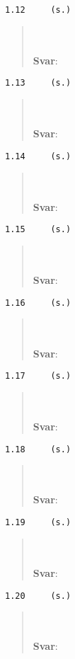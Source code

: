 \documentclass[a4paper]{article}
\newcommand{\tskcol}[1]{\textcolor{tskcol}{#1}}
\begin{document}
\texttt{\tskcol{1.12~~~~ (s.)}}
\begin{quotation}
	\noindent
	\\ \\
	\textbf{Svar}:
\end{quotation}

\texttt{\tskcol{1.13~~~~ (s.)}}
\begin{quotation}
	\noindent
	\\ \\
	\textbf{Svar}:
\end{quotation}

\texttt{\tskcol{1.14~~~~ (s.)}}
\begin{quotation}
	\noindent
	\\ \\
	\textbf{Svar}:
\end{quotation}

\texttt{\tskcol{1.15~~~~ (s.)}}
\begin{quotation}
	\noindent
	\\ \\
	\textbf{Svar}:
\end{quotation}

\texttt{\tskcol{1.16~~~~ (s.)}}
\begin{quotation}
	\noindent
	\\ \\
	\textbf{Svar}:
\end{quotation}

\texttt{\tskcol{1.17~~~~ (s.)}}
\begin{quotation}
	\noindent
	\\ \\
	\textbf{Svar}:
\end{quotation}

\texttt{\tskcol{1.18~~~~ (s.)}}
\begin{quotation}
	\noindent
	\\ \\
	\textbf{Svar}:
\end{quotation}

\texttt{\tskcol{1.19~~~~ (s.)}}
\begin{quotation}
	\noindent
	\\ \\
	\textbf{Svar}:
\end{quotation}

\texttt{\tskcol{1.20~~~~ (s.)}}
\begin{quotation}
	\noindent
	\\ \\
	\textbf{Svar}:
\end{quotation}
\end{document}
